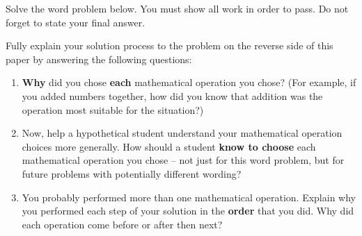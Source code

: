 
Solve the word problem below. You must show all work in order to pass. Do not forget to state your final answer.

\begin{statement}
\end{statement}

\begin{ansenv}
    \vspace{12pt}
\end{ansenv}

\newpage
{}

Fully explain your solution process to the problem on the reverse side of this paper by answering the following questions:
\begin{enumerate}
    \item \textbf{Why} did you chose \textbf{each} mathematical operation you chose? (For example, if you added numbers together, how did you know that addition was the operation most suitable for the situation?)

    \vfill

    \item Now, help a hypothetical student understand your mathematical operation choices more generally. How should a student \textbf{know to choose} each mathematical operation you chose -- not just for this word problem, but for future problems with potentially different wording?

    \vfill

    \item You probably performed more than one mathematical operation. Explain why you performed each step of your solution in the \textbf{order} that you did. Why did each operation come before or after then next?

    \vfill

\end{enumerate}